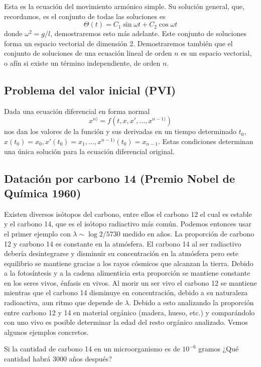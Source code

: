 \documentclass[../main.tex]{subfiles}
\begin{document}
Esta es la ecuación del movimiento armónico simple. Su solución general, que, 
recordamos, es el conjunto de todas las soluciones es
\[\Theta(t) = C_1 \sin \omega t + C_2 \cos \omega t\]
donde \(\omega^2 = g/l\), demostraremos esto más adelante. Este conjunto de
soluciones forma un espacio vectorial de dimensión 2. Demostraremos también que
el conjunto de soluciones de una ecuación lineal de orden \(n\) es un espacio
vectorial, o afín si existe un término independiente, de orden \(n\).

\subsection{Problema del valor inicial (PVI)}

Dada una ecuación diferencial en forma normal
\[x^{n)} = f(t, x, x', \dots, x^{n - 1)})\]
nos dan los valores de la función y sus derivadas en un tiempo determinado
\(t_0\), \(x(t_0) = x_0, x'(t_0) = x_1, \dots, x^{n - 1)}(t_0) = x_{n - 1}\).
Estas condiciones determinan una única solución para la ecuación diferencial
original.

\subsection{Datación por carbono 14 (Premio Nobel de Química 1960)}

Existen diversos isótopos del carbono, entre ellos el carbono 12 el cual es
estable y el carbono 14, que es el isótopo radiactivo más común. Podemos
entonces usar el primer ejemplo con \(\lambda \sim \log 2 / 5730\) medido en
años. La proporción de carbono 12 y carbono 14 es constante en la atmósfera. El
carbono 14 al ser radiactivo debería desintegrarse y disminuir su concentración
en la atmósfera pero este equilibrio se mantiene gracias a los rayos cósmicos
que alcanzan la tierra. Debido a la fotosíntesis y a la cadena alimenticia esta
proporción se mantiene constante en los seres vivos, énfasis en vivos. Al morir
un ser vivo el carbono 12 se mantiene mientras que el carbono 14 disminuye en
concentración, debido a su naturaleza radioactiva, aun ritmo que depende de
\(\lambda\). Debido a esto analizando la proporción entre carbono 12 y 14 en
material orgánico (madera, hueso, etc.) y comparándolo con uno vivo es posible
determinar la edad del resto orgánico analizado. Vemos algunos ejemplos
concretos.

\begin{example}
	Si la cantidad de carbono 14 en un microorganismo es de \(10^{-6}\) gramos 
	¿Qué cantidad habrá 3000 años después? 
\end{example}
\end{document}
